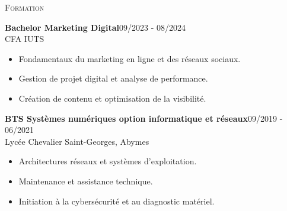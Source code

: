 \documentclass[11pt,a4paper]{article}
\newcommand{\headright}[1]{\vspace*{2.5ex}\textsc{\Large\color{cvblue}#1}\par%
  \vspace*{-2ex}{\color{cvblue}\hrulefill}\par}
\begin{document}
\begin{minipage}[t]{0.56\textwidth}
  \headright{Formation}
  \colorbox{maincolor}{%
  \begin{minipage}{\linewidth}
    \noindent
    \textbf{Bachelor Marketing Digital}\hfill 09/2023 - 08/2024\\
    CFA IUTS\\[-0.3em]
    \begin{itemize}[leftmargin=*]
      \item Fondamentaux du marketing en ligne et des réseaux sociaux. \item Gestion de projet digital et analyse de performance. \item Création de contenu et optimisation de la visibilité.
    \end{itemize}
  \end{minipage}}

\vspace{3mm}

\colorbox{maincolor}{%
  \begin{minipage}{\linewidth}
    \noindent
    \textbf{BTS Systèmes numériques option informatique et réseaux}\hfill 09/2019 - 06/2021\\
    Lycée Chevalier Saint-Georges, Abymes\\[-0.3em]
    \begin{itemize}[leftmargin=*]
      \item Architectures réseaux et systèmes d’exploitation. \item Maintenance et assistance technique. \item Initiation à la cybersécurité et au diagnostic matériel.
    \end{itemize}
  \end{minipage}}

\end{minipage}
\end{document}
